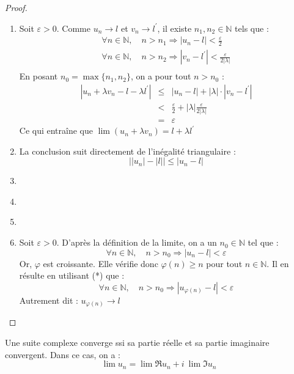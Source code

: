     \begin{proof}
        \ \\
        \begin{enumerate}[label=(\roman*)]
            \item Soit \(\varepsilon>0\). Comme \(u_n\to l\) et \(v_n \to l^{\prime}\), il existe \(n_1, n_2 \in \mathbb{N}\) tels que :
            \[
                \begin{array}{l}
                    \forall n \in \mathbb{N},\quad n > n_1 \Rightarrow |u_n - l| < \frac{\varepsilon}{2}\\
                    \forall n \in \mathbb{N},\quad n > n_2 \Rightarrow |v_n - l^{\prime}| < \frac{\varepsilon}{2|\lambda|}\\
                \end{array}    
            \]
            En posant \(n_0 = \max{\{n_1, n_2\}}\), on a pour tout \(n>n_0\) :
            \[
                \begin{array}{lcl}
                    |u_n + \lambda v_n - l - \lambda l^{\prime}| &\le& |u_n  - l| + |\lambda|\cdot|v_n - l^{\prime}|\\
                     &<& \frac{\varepsilon}{2} + |\lambda|\frac{\varepsilon}{2|\lambda|}\\
                     &=& \varepsilon
                \end{array}
            \]
            Ce qui entraîne que \(\lim (u_n + \lambda v_n) = l + \lambda l^{\prime}\) 
            
            \item La conclusion suit directement de l'inégalité triangulaire : \[\Big| |u_n| - |l| \Big| \le |u_n - l|\]
            \item \ 
            \item \ 
            \item \ 
            \item Soit \(\varepsilon > 0\). D'après la définition de la limite, on a un  \(n_0\in\mathbb{N}\) tel que : 
            \begin{equation*}
                \tag*{(*)}
                \forall n \in \mathbb{N}, \quad n > n_0 \Rightarrow |u_n - l| < \varepsilon 
            \end{equation*}
            Or, \(\varphi\) est croissante. Elle vérifie donc \(\varphi(n) \ge n\) pour tout \(n\in\mathbb{N}\). Il en résulte en utilisant (*) que :
            \[
                \forall n \in \mathbb{N}, \quad n > n_0 \Rightarrow |u_{\varphi(n)} - l| < \varepsilon     
            \]
            Autrement dit : \(u_{\varphi(n)} \to l\)
        \end{enumerate}
    \end{proof}

    \begin{corollary}
        Une suite complexe converge ssi sa partie réelle et sa partie imaginaire convergent. Dans ce cas, on a :
        \[\lim u_n = \lim \Re{u_n} + i\ \lim\Im{u_n}\] 
    \end{corollary}